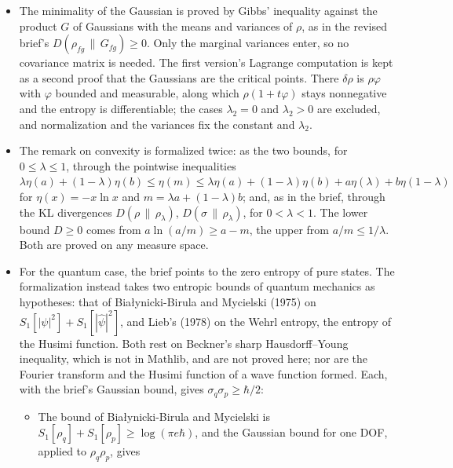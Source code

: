 \documentclass[11pt]{article}
\begin{document}
\begin{itemize}
  preserve it: their Jacobian determinant has square~$1$, since they preserve the nondegenerate
  form~$\omega$. That representation-independent ZENT is strictly stronger than ZENT in the
  given coordinates is not shown.
  Physical units are not modelled, so the brief's requirement that $f, g$ carry the units of
  $q, p$ is not needed.
\item The minimality of the Gaussian is proved by Gibbs' inequality against the product $G$ of
  Gaussians with the means and variances of $\rho$, as in the revised brief's
  $D(\rho_{fg}\,\|\,G_{fg}) \ge 0$. Only the marginal variances enter, so no covariance matrix is
  needed. The first version's Lagrange computation is kept as a second proof that the Gaussians
  are the critical points. There $\delta\rho$ is $\rho\varphi$ with $\varphi$ bounded and
  measurable, along which $\rho(1 + t\varphi)$ stays nonnegative and the entropy is
  differentiable; the cases $\lambda_2 = 0$ and $\lambda_2 > 0$ are excluded, and normalization
  and the variances fix the constant and $\lambda_2$.
\item The remark on convexity is formalized twice: as the two bounds, for
  $0 \le \lambda \le 1$, through the pointwise inequalities $\lambda\eta(a) + (1-\lambda)\eta(b)
  \le \eta(m) \le \lambda\eta(a) + (1-\lambda)\eta(b) + a\eta(\lambda) + b\eta(1-\lambda)$ for
  $\eta(x) = -x\ln x$ and $m = \lambda a + (1-\lambda)b$; and, as in the brief, through the KL
  divergences $D(\rho\,\|\,\rho_\lambda)$, $D(\sigma\,\|\,\rho_\lambda)$, for
  $0 < \lambda < 1$. The lower bound $D \ge 0$ comes from $a\ln(a/m) \ge a - m$, the upper
  from $a/m \le 1/\lambda$. Both are proved on any measure space.
\item For the quantum case, the brief points to the zero entropy of pure states. The
  formalization instead takes two entropic bounds of quantum mechanics as hypotheses: that of
  Bia\l{}ynicki-Birula and Mycielski (1975) on $S_1[|\psi|^2] + S_1[|\hat\psi|^2]$, and Lieb's
  (1978) on the Wehrl entropy, the entropy of the Husimi function. Both rest on Beckner's sharp
  Hausdorff--Young inequality, which is not in Mathlib, and are not proved here; nor are the
  Fourier transform and the Husimi function of a wave function formed. Each, with the brief's
  Gaussian bound, gives $\sigma_q\sigma_p \ge \hbar/2$:
  \begin{itemize}
  \item The bound of Bia\l{}ynicki-Birula and Mycielski is $S_1[\rho_q] + S_1[\rho_p] \ge
    \log(\pi e\hbar)$, and the Gaussian bound for one DOF, applied to $\rho_q\rho_p$, gives

\end{itemize}
\end{itemize}
\end{document}

